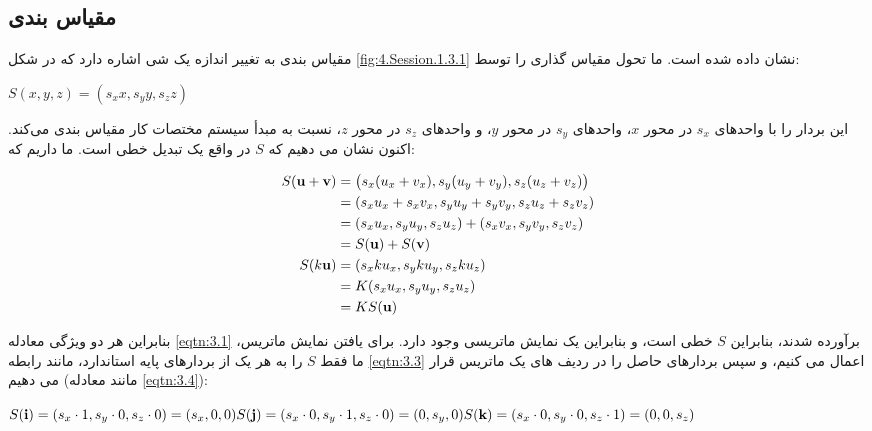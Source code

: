\subsection{\textbf{مقیاس بندی}}
{
    \Large
    \begin{spacing}{1.5}
        مقیاس بندی به تغییر اندازه یک شی اشاره دارد که در شکل \ref{fig:4.Session.1.3.1} نشان داده شده است.
        ما تحول مقیاس گذاری را توسط:

        \begin{center}
            $S(x,y,z)=(s_{x}x,s_{y}y,s_{z}z)$
        \end{center}

        این بردار را با واحدهای $s_x$ در محور $x$، واحدهای $s_y$ در محور $y$، و واحدهای $s_z$ در محور $z$،
        نسبت به مبدأ سیستم مختصات کار مقیاس بندی می‌کند.
        اکنون نشان می دهیم که $S$ در واقع یک تبدیل خطی است. ما داریم که:

        \begin{equation*}
            \centering
            \begin{split}
                S(\textbf{u}+\textbf{v})&=\left( s_{x}(u_{x}+v_{x}), s_{y}(u_{y}+v_{y}), s_{z}(u_{z}+v_{z}) \right) \\
                &=(s_{x}u_{x}+s_{x}v_{x}, s_{y}u_{y}+s_{y}v_{y}, s_{z}u_{z}+s_{z}v_{z}) \\
                &=(s_{x}u_{x}, s_{y}u_{y}, s_{z}u_{z})+(s_{x}v_{x}, s_{y}v_{y}, s_{z}v_{z}) \\
                &=S(\textbf{u})+S(\textbf{v}) \\
                S(k\textbf{u})&=(s_{x}ku_{x}, s_{y}ku_{y}, s_{z}ku_{z}) \\
                &=K(s_{x}u_{x}, s_{y}u_{y}, s_{z}u_{z}) \\
                &=KS(\textbf{u}) \\
            \end{split}
        \end{equation*}

        بنابراین هر دو ویژگی معادله \ref{eqtn:3.1} برآورده شدند، بنابراین $S$ خطی است،
        و بنابراین یک نمایش ماتریسی وجود دارد. برای یافتن نمایش ماتریس، ما فقط $S$ را به هر یک از بردارهای پایه استاندارد، مانند رابطه \ref{eqtn:3.3} اعمال می کنیم،
        و سپس بردارهای حاصل را در ردیف های یک ماتریس قرار می دهیم (مانند معادله \ref{eqtn:3.4}):

        \begin{center}
            $S(\textbf{i})=(s_x\cdot 1,s_y\cdot 0,s_z\cdot 0)=(s_x,0,0) \\
            S(\textbf{j})=(s_x\cdot 0,s_y\cdot 1,s_z\cdot 0)=(0,s_y,0) \\
            S(\textbf{k})=(s_x\cdot 0,s_y\cdot 0,s_z\cdot 1)=(0,0,s_z)$
        \end{center}


\end{spacing}}
